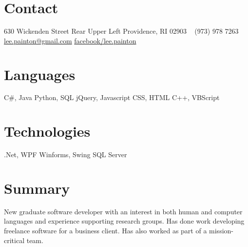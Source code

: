 \documentclass[]{friggeri-cv} %
\begin{document}


\begin{aside} %
\section{\color{brown}Con\color{black}tact}
630 Wickenden Street
Rear Upper Left
Providence, RI 02903
~
(973) 978 7263
~
\href{mailto:lee.painton@gmail.com}{lee.painton@gmail.com}
\href{https://www.facebook.com/lee.painton}{facebook/lee.painton}
\section{\color{violet}Lang\color{black}uages}
{\LARGE C\#, Java}
{\large Python, SQL}
{jQuery, Javascript}
{\small CSS, HTML}
{\footnotesize C++, VBScript}
\section{\color{olive}Tech\color{black}nologies}
{\LARGE .Net, WPF}
{\large Winforms, Swing}
{SQL Server}
\end{aside}


\section{Summary}

New graduate software developer with an interest in both human and computer languages and experience supporting research groups.  Has done work developing freelance software for a business client.  Has also worked as part of a mission-critical team.

\end{document}

